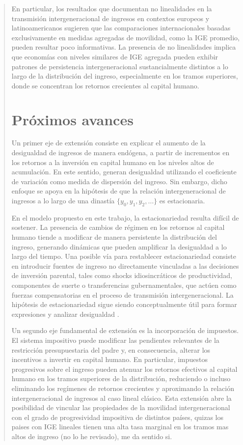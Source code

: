 \documentclass[12pt]{article}
\begin{document}
\begin{abstract}
En particular, los resultados que documentan no linealidades en la transmisión intergeneracional de ingresos en contextos europeos y latinoamericanos sugieren que las comparaciones internacionales basadas exclusivamente en medidas agregadas de movilidad, como la IGE promedio, pueden resultar poco informativas. La presencia de no linealidades implica que economías con niveles similares de IGE agregada pueden exhibir patrones de persistencia intergeneracional sustancialmente distintos a lo largo de la distribución del ingreso, especialmente en los tramos superiores, donde se concentran los retornos crecientes al capital humano.


\section{Próximos avances}

Un primer eje de extensión consiste en explicar el aumento de la desigualdad de ingresos de manera endógena, a partir de incrementos en los retornos a la inversión en capital humano en los niveles altos de acumulación. En este sentido, \textcite{Becker_Tomes_1979} generan desigualdad utilizando el coeficiente de variación como medida de dispersión del ingreso. Sin embargo, dicho enfoque se apoya en la hipótesis de que la relación intergeneracional de ingresos a lo largo de una dinastía $\{y_0, y_1, y_2, \ldots\}$ es estacionaria.

En el modelo propuesto en este trabajo, la estacionariedad resulta difícil de sostener. La presencia de cambios de régimen en los retornos al capital humano tiende a modificar de manera persistente la distribución del ingreso, generando dinámicas que pueden amplificar la desigualdad a lo largo del tiempo. Una posible vía para restablecer estacionariedad consiste en introducir fuentes de ingreso no directamente vinculadas a las decisiones de inversión parental, tales como shocks idiosincráticos de productividad, componentes de suerte o transferencias gubernamentales, que actúen como fuerzas compensatorias en el proceso de transmisión intergeneracional. La hipótesis de estacionariedad sigue siendo conceptualmente útil  para formar expresiones y analizar desigualdad \parencite{Becker_Tomes_1979,Solon_1999,Solon_2004,Bratsberg_2007}.

Un segundo eje fundamental de extensión es la incorporación de impuestos. El sistema impositivo puede modificar las pendientes relevantes de la restricción presupuestaria del padre y, en consecuencia, alterar los incentivos a invertir en capital humano. En particular, impuestos progresivos sobre el ingreso pueden atenuar los retornos efectivos al capital humano en los tramos superiores de la distribución, reduciendo o incluso eliminando los regímenes de retornos crecientes y aproximando la relación intergeneracional de ingresos al caso lineal clásico. Esta extensión abre la posibilidad de vincular las propiedades de la movilidad intergeneracional con el grado de progresividad impositiva de distintos países, quizas los paises con IGE lineales tienen una alta tasa marginal en los tramos mas altos de ingreso (no lo he revisado), me da sentido si.


\end{abstract}
\end{document}
